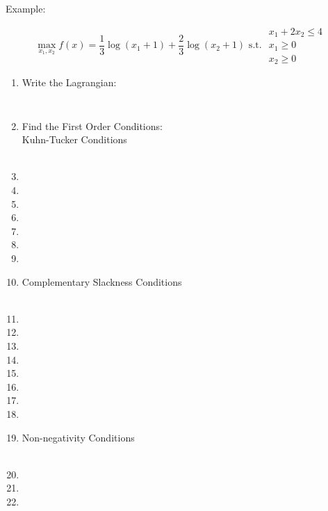 \documentclass[]{book}
\theoremstyle{definition}
\theoremstyle{definition}
\theoremstyle{definition}
\theoremstyle{remark}
\begin{document}
Example:

\[\max_{x_1,x_2} f(x) = \frac{1}{3}\log (x_1 + 1) + \frac{2}{3}\log (x_2 + 1) \text{ s.t. }  
\begin{array}{l}
x_1 + 2x_2 \leq 4\\
     x_1 \geq 0\\
    x_2 \geq 0
\end{array}\]

\begin{enumerate}
\item Write the Lagrangian:
$$\phantom{L(x_1, x_2, \lambda) =  \frac{1}{3}\log(x_1+1) + \frac{2}{3}\log(x_2+1) - \lambda(x_1 + 2x_2 - 4)}$$

\item Find the First Order Conditions:\\
Kuhn-Tucker Conditions\\
\\
\item[]
\item[]
\item[]
\item[]
\item[]
\item[]
\item[]
\item[]
 
Complementary Slackness Conditions\\
\\
\item[]
\item[]
\item[]
\item[]
\item[]
\item[]
\item[]
\item[]
\item[]

Non-negativity Conditions\\
\phantom{$x_1  \geq  0$\\
$x_2  \geq  0$\\
$\lambda  \geq  $0}\\
\item[]
\item[]
\item[]


\end{enumerate}
\end{document}
